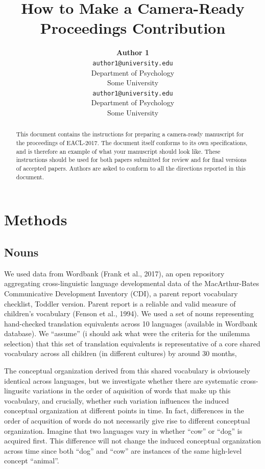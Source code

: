\documentclass[11pt]{article}
\title{How to Make a Camera-Ready Proceedings Contribution}
\author{{\large \bf Author 1} \\ \texttt{author1@university.edu} \\ Department of Psychology \\ Some University \And {\large \bf Author 2} \\ \texttt{author1@university.edu} \\ Department of Psychology \\ Some University}
\date{}
\begin{document}
\maketitle

\begin{abstract}
This document contains the instructions for preparing a camera-ready
manuscript for the proceedings of EACL-2017. The document itself
conforms to its own specifications, and is therefore an example of what
your manuscript should look like. These instructions should be used for
both papers submitted for review and for final versions of accepted
papers. Authors are asked to conform to all the directions reported in
this document.
\end{abstract}

\section{Methods}\label{methods}

\subsection{Nouns}\label{nouns}

We used data from Wordbank (Frank et al., 2017), an open repository
aggregating cross-linguistic language developmental data of the
MacArthur-Bates Communicative Development Inventory (CDI), a parent
report vocabulary checklist, Toddler version. Parent report is a
reliable and valid measure of children's vocabulary (Fenson et al.,
1994). We used a set of nouns representing hand-checked translation
equivalents across 10 languages (available in Wordbank database). We
``assume'' (i should ask what were the criteria for the unilemma
selection) that this set of translation equivalents is representative of
a core shared vocabulary across all children (in different cultures) by
around 30 months,

The conceptual organization derived from this shared vocabulary is
obviousely identical across languages, but we investigate whether there
are systematic cross-lingusitc variations in the order of aquisition of
words that make up this vocabulary, and crucially, whether such
variation influences the induced conceptual organization at different
points in time. In fact, differences in the order of acqusition of words
do not necessarily give rise to different conceptual organization.
Imagine that two languages vary in whether ``cow'' or ``dog'' is
acquired first. This difference will not change the induced conceptual
organization across time since both ``dog'' and ``cow'' are instances of
the same high-level concept ``animal''.
\end{document}
